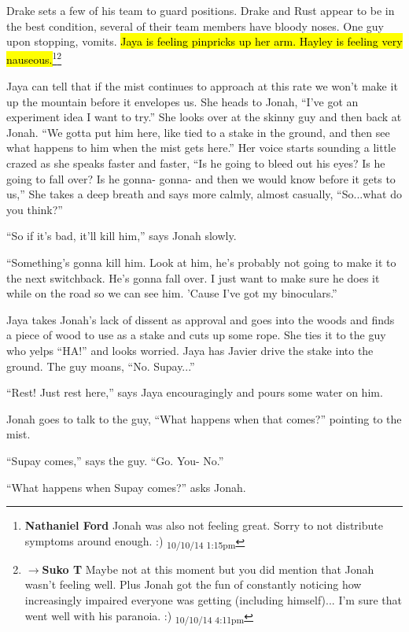 Drake sets a few of his team to guard positions.  Drake and Rust appear to be in the best condition, several of their team members have bloody noses.  One guy upon stopping, vomits.  \hl{Jaya is feeling pinpricks up her arm.  Hayley is feeling very nauseous.}\footnote{\textbf{Nathaniel Ford }Jonah was also not feeling great. Sorry to not distribute symptoms around enough. :) \textsubscript{10/10/14 1:15pm}}\footnote{$\rightarrow$\textbf{Suko T }Maybe not at this moment but you did mention that Jonah wasn't feeling well.  Plus Jonah got the fun of constantly noticing how increasingly impaired everyone was getting (including himself)... I'm sure that went well with his paranoia. :) \textsubscript{10/10/14 4:11pm}}



Jaya can tell that if the mist continues to approach at this rate we won't make it up the mountain before it envelopes us.  She heads to Jonah, ``I've got an experiment idea I want to try.''  She looks over at the skinny guy and then back at Jonah. ``We gotta put him here, like tied to a stake in the ground, and then see what happens to him when the mist gets here.''  Her voice starts sounding a little crazed as she speaks faster and faster, ``Is he going to bleed out his eyes?  Is he going to fall over?  Is he gonna- gonna- and then we would know before it gets to us,''  She takes a deep breath and says more calmly, almost casually, ``So...what do you think?''

``So if it's bad, it'll kill him,'' says Jonah slowly.

``Something's gonna kill him.  Look at him, he's probably not going to make it to the next switchback.  He's gonna fall over.  I just want to make sure he does it while on the road so we can see him.  'Cause I've got my binoculars.''

Jaya takes Jonah's lack of dissent as approval and goes into the woods and finds a piece of wood to use as a stake and cuts up some rope.  She ties it to the guy who yelps ``HA!'' and looks worried.  Jaya has Javier drive the stake into the ground.  The guy moans, ``No.  Supay...''

``Rest!  Just rest here,'' says Jaya encouragingly and pours some water on him.

Jonah goes to talk to the guy, ``What happens when that comes?'' pointing to the mist.

``Supay comes,'' says the guy.  ``Go.  You- No.''

``What happens when Supay comes?'' asks Jonah.

